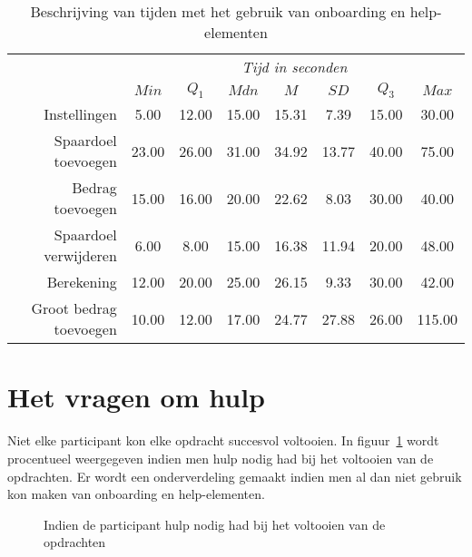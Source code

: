 \begin{table}[]
	\centering
	\begin{tabular}{r|ccccccc}
		\multicolumn{1}{l|}{} & \multicolumn{7}{c}{\textit{Tijd in seconden}} \\
		& $Min$ & $Q_1$ & $Mdn$ & $M$ & $SD$ & $Q_3$ & $Max$ \\ \hline
		Instellingen & 5.00 & 12.00 & 15.00 & 15.31 & 7.39 & 15.00 & 30.00 \\
		Spaardoel toevoegen & 23.00 & 26.00 & 31.00 & 34.92 & 13.77 & 40.00 & 75.00 \\
		Bedrag toevoegen & 15.00 & 16.00 & 20.00 & 22.62 & 8.03 & 30.00 & 40.00 \\
		Spaardoel verwijderen & 6.00 & 8.00 & 15.00 & 16.38 & 11.94 & 20.00 & 48.00 \\
		Berekening & 12.00 & 20.00 & 25.00 & 26.15 & 9.33 & 30.00 & 42.00 \\
		Groot bedrag toevoegen & 10.00 & 12.00 & 17.00 & 24.77 & 27.88 & 26.00 & 115.00
	\end{tabular}
	\caption{Beschrijving van tijden met het gebruik van onboarding en help-elementen}
	\label{tab:beschrijving-tijden-met-elementen}
\end{table}

\section{Het vragen om hulp}
\label{sec:vragen-hulp}

Niet elke participant kon elke opdracht succesvol voltooien. In figuur~\ref{fig:beschrijving-hulp} wordt procentueel weergegeven indien men hulp nodig had bij het voltooien van de opdrachten. Er wordt een onderverdeling gemaakt indien men al dan niet gebruik kon maken van onboarding en help-elementen.

\begin{figure}[h]
    \centering
    \qquad
    \qquad
    \qquad
    \qquad
    \qquad
    \caption{Indien de participant hulp nodig had bij het voltooien van de opdrachten}
    \label{fig:beschrijving-hulp}
\end{figure}

